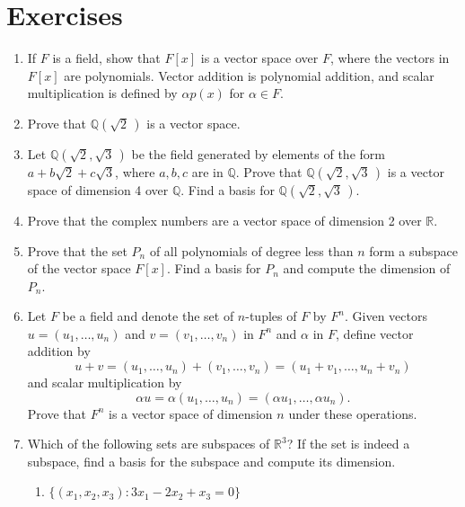  
\section*{Exercises}
\exrule

 
{\small
\begin{enumerate}

  
\item
If $F$ is a field, show that $F[x]$ is a vector space over $F$, where
the vectors in $F[x]$ are polynomials.  Vector addition is polynomial
addition, and scalar multiplication is defined by $\alpha p(x)$ for
$\alpha \in F$.  

\item
Prove that ${\mathbb Q }( \sqrt{2}\, )$ is a vector space.


\item
Let ${\mathbb Q }( \sqrt{2}, \sqrt{3}\, )$ be the field generated by
elements of the form $a + b \sqrt{2}  + c \sqrt{3}$, where $a, b, c$
are in ${\mathbb Q}$. Prove that ${\mathbb Q }( \sqrt{2}, \sqrt{3}\, )$ is a
vector space of dimension 4 over ${\mathbb Q}$.  Find a basis for 
${\mathbb Q }( \sqrt{2}, \sqrt{3}\, )$.


\item 
Prove that the complex numbers are a vector space of dimension 2
over ${\mathbb R}$. 


\item
Prove that the set $P_n$ of all polynomials of degree less than $n$
form a subspace of the vector space $F[x]$. Find a basis for $P_n$ and
compute the dimension of~$P_n$. 


\item
Let $F$ be a field and denote the set of $n$-tuples of $F$ by $F^n$.
Given vectors $u = (u_1, \ldots, u_n)$ and $v = (v_1, \ldots, v_n)$ in
$F^n$ and $\alpha$ in $F$, define vector addition by
\[
u + v = (u_1, \ldots, u_n) + (v_1, \ldots, v_n)
=
(u_1 + v_1, \ldots, u_n + v_n)
\]
and scalar multiplication by 
\[
\alpha u = \alpha(u_1, \ldots, u_n)= (\alpha u_1, \ldots, \alpha u_n).
\]
Prove that $F^n$ is a vector space of dimension $n$ under these
operations. 


\item
Which of the following sets are subspaces of ${\mathbb R}^3$? If the set
is indeed a subspace, find a basis for the subspace and compute its
dimension.
\begin{enumerate}

  \item
$\{ (x_1, x_2, x_3) : 3 x_1 - 2 x_2 + x_3 = 0 \}$


\end{enumerate}
\end{enumerate}}
